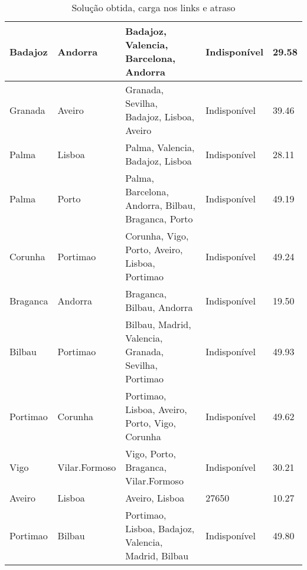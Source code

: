 \begin{table}[!htb]
{\begin{tabular}{|l|l|l|l|l|}
Badajoz & Andorra & Badajoz, Valencia, Barcelona, Andorra & Indisponível & 29.58 \\ \hline
Granada & Aveiro & Granada, Sevilha, Badajoz, Lisboa, Aveiro & Indisponível & 39.46 \\ \hline
Palma & Lisboa & Palma, Valencia, Badajoz, Lisboa & Indisponível & 28.11 \\ \hline
Palma & Porto & Palma, Barcelona, Andorra, Bilbau, Braganca, Porto & Indisponível & 49.19 \\ \hline
Corunha & Portimao & Corunha, Vigo, Porto, Aveiro, Lisboa, Portimao & Indisponível & 49.24 \\ \hline
Braganca & Andorra & Braganca, Bilbau, Andorra & Indisponível & 19.50 \\ \hline
Bilbau & Portimao & Bilbau, Madrid, Valencia, Granada, Sevilha, Portimao & Indisponível & 49.93 \\ \hline
Portimao & Corunha & Portimao, Lisboa, Aveiro, Porto, Vigo, Corunha & Indisponível & 49.62 \\ \hline
Vigo & Vilar.Formoso & Vigo, Porto, Braganca, Vilar.Formoso & Indisponível & 30.21 \\ \hline
Aveiro & Lisboa & Aveiro, Lisboa & 27650 & 10.27 \\ \hline
Portimao & Bilbau & Portimao, Lisboa, Badajoz, Valencia, Madrid, Bilbau & Indisponível & 49.80 \\ \hline
\end{tabular}}
\caption[]{Solução obtida, carga nos links e atraso}
\end{table}

